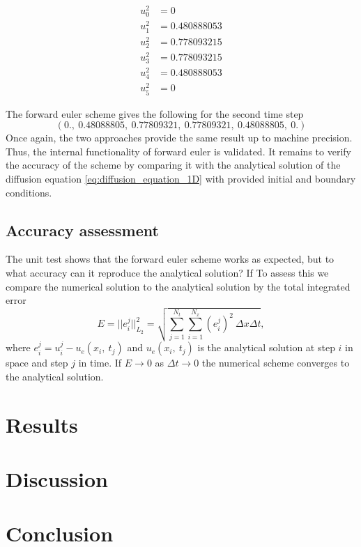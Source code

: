 \documentclass[12pt]{extarticle}
\begin{document}
\begin{align*}
	u_0^2 &= 0 \\
	u_1^2 &= 0.480888053 \\
	u_2^2 &= 0.778093215 \\
	u_3^2 &= 0.778093215 \\
	u_4^2 &= 0.480888053 \\
	u_5^2 &= 0
\end{align*}

The forward euler scheme gives the following for the second time step
\[ (0.,\:         0.48088805,\: 0.77809321,\: 0.77809321,\: 0.48088805,\: 0.        ) \]
Once again, the two approaches provide the same result up to machine precision. Thus, the internal functionality of forward euler is validated. It remains to verify the accuracy of the scheme by comparing it with the analytical solution of the diffusion equation \ref{eq:diffusion_equation_1D} with provided initial and boundary conditions.

\subsection*{Accuracy assessment}
The unit test shows that the forward euler scheme works as expected, but to what accuracy can it reproduce the analytical solution? If  To assess this we compare the numerical solution to the analytical solution by the total integrated error \cite{Linge2017}
\[ E = ||e_i^j||_{L_2}^2 = \sqrt{\sum_{j=1}^{N_t} \sum_{i=1}^{N_x} (e_i^j)^2 \: \Delta x \Delta t}, \]
where $e_i^j = u_i^j - u_e(x_i,\:t_j)$ and $u_e(x_i,\:t_j)$ is the analytical solution at step $i$ in space and step $j$ in time. If $E \rightarrow 0$ as $\Delta t \rightarrow 0$ the numerical scheme converges to the analytical solution.




\section{Results}
\section{Discussion}
\section{Conclusion}



\end{document}
